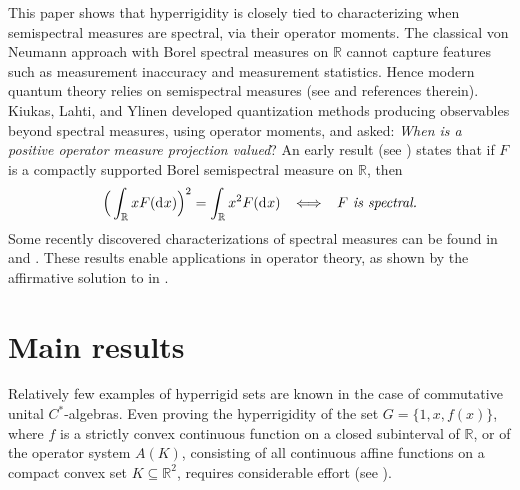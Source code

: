 \documentclass[reqno]{amsproc}
\numberwithin{equation}{section}
\theoremstyle{remark}
\newcommand*{\D}{\mathrm{d\hspace{.1ex}}}
\theoremstyle{definition}
\newcommand*{\rbb}{\mathbb{R}}
\begin{document}
This paper shows that hyperrigidity is closely tied to
characterizing when semispectral measures are
spectral, via their operator moments. The classical
von Neumann approach with Borel spectral measures on
$\rbb$ cannot capture features such as measurement
inaccuracy and measurement statistics. Hence modern
quantum theory relies on semispectral measures (see
\cite{P-S22-b} and references therein). Kiukas, Lahti,
and Ylinen \cite{KLY06JMAA,KLY06JMP} developed
quantization methods producing observables beyond
spectral measures, using operator moments, and asked:
{\em When is a positive operator measure projection
valued}\/? An early result (see
\cite{K-dM87,KLY06JMP,P-S21}) states that if $F$ is a
compactly supported Borel semispectral measure on
$\mathbb{R}$, then
   \begin{align} \label{fspyr}
\Big(\int_{\rbb} x F(\D x)\Big)^{2} = \int_{\rbb}
x^{2} F(\D x) \;\; \iff \;\; \textit{$F$ is spectral.}
   \end{align}
Some recently discovered characterizations of spectral
measures can be found in \cite[Theorem~4.2]{P-S21} and
\cite[Theorem~1.7]{P-S22-b}. These results enable
applications in operator theory, as shown by the
affirmative solution to \cite[Problem~1.1]{Curto20} in
\cite{P-S21}.
   \section{\label{Sec.m}Main results}
Relatively few examples of hyperrigid sets are known
in the case of commutative unital $C^*$-algebras. Even
proving the hyperrigidity of the set $G = \{1, x,
f(x)\}$, where $f$ is a strictly convex continuous
function on a closed subinterval of $\mathbb{R}$, or
of the operator system $A(K)$, consisting of all
continuous affine functions on a compact convex set $K
\subseteq \mathbb{R}^2$, requires considerable effort
(see \cite{Brown16, Sch24}).
\end{document}

